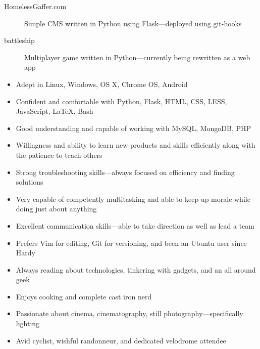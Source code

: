\documentclass[letterpaper]{article}        %
\begin{document}
  
  
  
  



  \begin{description}
    \item[HomelessGaffer.com] Simple CMS written in Python using Flask---deployed using git-hooks
    \item[battleship] Multiplayer game written in Python---currently being rewritten as a web app
    
  \end{description}





  \begin{multicols}{2}
    \begin{itemize}
    
    \item Adept in Linux, Windows, OS X, Chrome OS, Android
    
    \item Confident and comfortable with Python, Flask, HTML, CSS, LESS, JavaScript, \LaTeX{}, Bash
    
    \item Good understanding and capable of working with MySQL, MongoDB, PHP
    
    \item Willingness and ability to learn new products and skills efficiently along with the patience to teach others
    
    \item Strong troubleshooting skills---always focused on efficiency and finding solutions
    
    \item Very capable of competently multitasking and able to keep up morale while doing just about anything
    
    \item Excellent communication skills---able to take direction as well as lead a team
    
    \item Prefers Vim for editing, Git for versioning, and been an Ubuntu user since Hardy
    
    \item Always reading about technologies, tinkering with gadgets, and an all around geek
    
    \item Enjoys cooking and complete cast iron nerd
    
    \item Passionate about cinema, cinematography, still photography---specifically lighting
    
    \item Avid cyclist, wishful randonneur, and dedicated velodrome attendee
    
    \end{itemize}
  \end{multicols}
\end{document}
